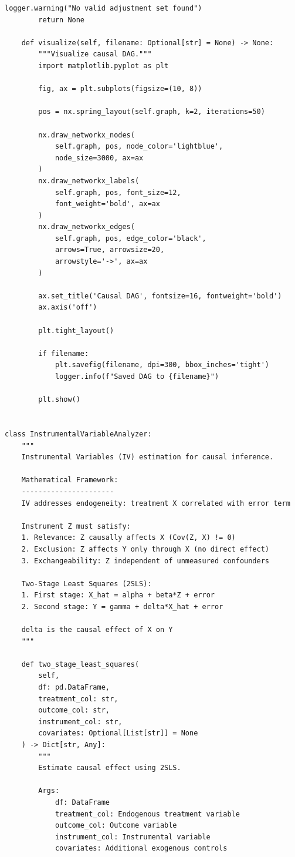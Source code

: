 \begin{lstlisting}[style=python, caption={DAG-based causal inference with backdoor criterion}]
        logger.warning("No valid adjustment set found")
        return None

    def visualize(self, filename: Optional[str] = None) -> None:
        """Visualize causal DAG."""
        import matplotlib.pyplot as plt

        fig, ax = plt.subplots(figsize=(10, 8))

        pos = nx.spring_layout(self.graph, k=2, iterations=50)

        nx.draw_networkx_nodes(
            self.graph, pos, node_color='lightblue',
            node_size=3000, ax=ax
        )
        nx.draw_networkx_labels(
            self.graph, pos, font_size=12,
            font_weight='bold', ax=ax
        )
        nx.draw_networkx_edges(
            self.graph, pos, edge_color='black',
            arrows=True, arrowsize=20,
            arrowstyle='->', ax=ax
        )

        ax.set_title('Causal DAG', fontsize=16, fontweight='bold')
        ax.axis('off')

        plt.tight_layout()

        if filename:
            plt.savefig(filename, dpi=300, bbox_inches='tight')
            logger.info(f"Saved DAG to {filename}")

        plt.show()


class InstrumentalVariableAnalyzer:
    """
    Instrumental Variables (IV) estimation for causal inference.

    Mathematical Framework:
    ----------------------
    IV addresses endogeneity: treatment X correlated with error term

    Instrument Z must satisfy:
    1. Relevance: Z causally affects X (Cov(Z, X) != 0)
    2. Exclusion: Z affects Y only through X (no direct effect)
    3. Exchangeability: Z independent of unmeasured confounders

    Two-Stage Least Squares (2SLS):
    1. First stage: X_hat = alpha + beta*Z + error
    2. Second stage: Y = gamma + delta*X_hat + error

    delta is the causal effect of X on Y
    """

    def two_stage_least_squares(
        self,
        df: pd.DataFrame,
        treatment_col: str,
        outcome_col: str,
        instrument_col: str,
        covariates: Optional[List[str]] = None
    ) -> Dict[str, Any]:
        """
        Estimate causal effect using 2SLS.

        Args:
            df: DataFrame
            treatment_col: Endogenous treatment variable
            outcome_col: Outcome variable
            instrument_col: Instrumental variable
            covariates: Additional exogenous controls


\end{lstlisting}
